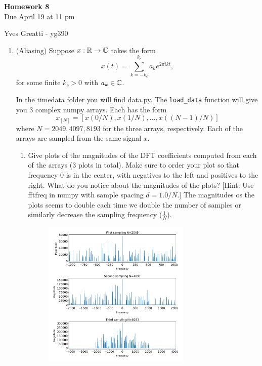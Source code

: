 \documentclass[12pt,twoside]{article}
\begin{document}
\begin{center}
{\large{\textbf{Homework 8}} } \vspace{0.2cm}\\
Due April 19 at 11 pm
\end{center}
Yves Greatti - yg390\\

\begin{enumerate}

 \item (Aliasing) Suppose $x:\mathbb{R}\to\mathbb{C}$ takes the form 
  $$x(t) = \sum_{k=-k_c}^{k_c} a_ke^{2\pi i kt},$$
  for some finite $k_c>0$ with $a_k\in\mathbb{C}$.  

  In the timedata folder you will find data.py.  The 
  \texttt{load\_data} function will give you 3 complex numpy arrays.  Each
  has the form
  $$x_{[N]}=[x(0/N),x(1/N),\ldots,x((N-1)/N)]$$
  where $N=2049,4097,8193$ for the three arrays, respectively.  Each of
  the arrays are sampled from the same signal $x$.
  \begin{enumerate}
  \item Give plots of the magnitudes of the DFT
    coefficients computed from each of the arrays (3 plots in total).
    Make sure to order your plot so
    that frequency 0 is in the center, with negatives to the left
    and positives to the right. What do you notice about the
    magnitudes of the plots?
    [Hint: Use fftfreq in numpy with sample spacing $d=1.0/N$.]
    The magnitudes os the plots seems to double each time we double the number of samples or similarly decrease
    the sampling frequency ($\frac{1}{N}$).
    
	\begin{figure}[H]
		\centering
		\captionsetup{justification=centering}
		\includegraphics[width=200pt]{code/timedata/question_1.pdf}
	\end{figure}
    

\end{enumerate}
\end{enumerate}
\end{document}
